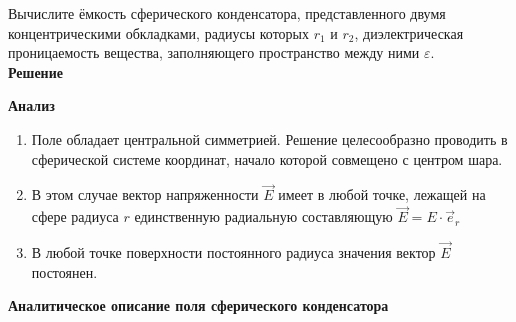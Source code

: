 \documentclass[__main__.tex]{subfiles}
\begin{document}
	
	Вычислите ёмкость сферического конденсатора, представленного двумя концентрическими обкладками, радиусы которых $r_1$ и $r_2$, диэлектрическая проницаемость вещества, заполняющего пространство между ними $\varepsilon$.\\ 
	
	\textbf{Решение}\\
	\begin{figure}[h]
		\center{\texttt{[image: c-07-1]}}
	\end{figure}
	
	\textbf{Анализ}
	\begin{enumerate}
		\item Поле обладает центральной симметрией. Решение целесообразно проводить в сферической системе координат, начало которой совмещено с центром шара. 
		\item В этом случае вектор напряженности $\vec{E}$ имеет в любой точке, лежащей на сфере радиуса $r$  единственную радиальную составляющую $\vec{E} = E\cdot \vec{e}_r$
		\item В любой точке поверхности постоянного радиуса значения вектор $\vec{E}$ постоянен.
	\end{enumerate}
	\textbf{Аналитическое описание поля сферического конденсатора}
	\begin{figure}[h]
		\center{\texttt{[image: c-07-2]}}
	\end{figure}
	
\end{document}
